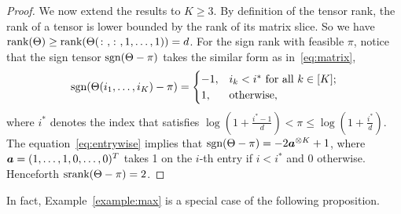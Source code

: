\documentclass[11pt]{article}
\theoremstyle{plain}
\theoremstyle{definition}
\def\sign{\textup{sgn}}
\def\srank{\textup{srank}}
\def\rank{\textup{rank}}
\begin{document}
\begin{proof}
We now extend the results to $K\geq 3$. By definition of the tensor rank, the rank of a tensor is lower bounded by the rank of its matrix slice.  So we have $\rank(\Theta)\geq \rank(\Theta(\colon,\colon,1,\ldots,1))=d$. For the sign rank with feasible $\pi$, notice that the sign tensor $\sign(\Theta-\pi)$ takes the similar form as in~\eqref{eq:matrix},
\begin{equation}\label{eq:entrywise}
\sign (\Theta(i_1,\ldots,i_K)-\pi)=
\begin{cases}
-1, & \text{$i_k<i^*$ for all $k\in[K]$};\\
1, & \text{otherwise},
\end{cases}
\end{equation}
where $i^*$ denotes the index that satisfies $\log(1+\frac{i^*-1}{d})<\pi\leq \log(1+\frac{i^*}{d})$.
The equation~\eqref{eq:entrywise} implies that $\sign(\Theta-\pi)=-2\ma^{\otimes K}+1$, where $\bm{a}=(1,\ldots,1,0,\ldots,0)^T$ takes 1 on the $i$-th entry if $i<i^*$ and 0 otherwise. Henceforth $\srank(\Theta-\pi)=2$. 
\end{proof}

In fact, Example~\ref{example:max} is a special case of the following proposition. 
\end{document}
